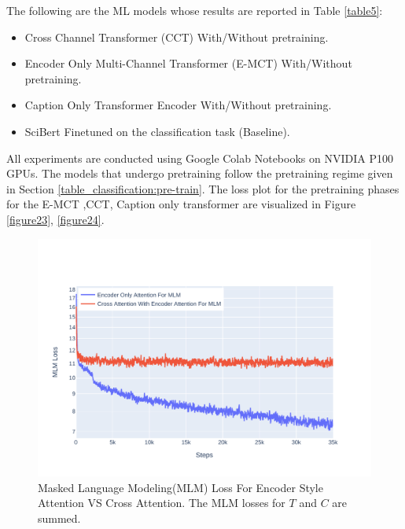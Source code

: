 The following are the ML models whose results are reported in Table \ref{table5}:
\begin{itemize}
    \item Cross Channel Transformer (CCT) With/Without pretraining. 
    \item Encoder Only Multi-Channel Transformer (E-MCT) With/Without pretraining. 
    \item Caption Only Transformer Encoder With/Without pretraining. 
    \item SciBert Finetuned on the classification task (Baseline). 
\end{itemize}
All experiments are conducted using Google Colab Notebooks on NVIDIA P100 GPUs. The models that undergo pretraining follow the pretraining regime given in Section \ref{table_classification:pre-train}. The loss plot for the pretraining phases for the E-MCT ,CCT, Caption only transformer are visualized in Figure \ref{figure23}, \ref{figure24}. 


\begin{figure}[h]
    \centering
    \includegraphics[width=\maxwidth{\textwidth}]{src/images/mlm-loss-comparison.pdf}
    \caption{Masked Language Modeling(MLM) Loss For Encoder Style Attention VS Cross Attention. The MLM losses for $T$ and $C$ are summed. }
    \label{figure\arabic{figurecounter}}
\end{figure}

